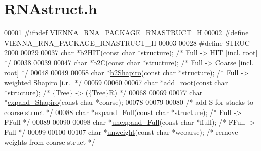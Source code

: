 \hypertarget{RNAstruct_8h_source}{}\section{R\+N\+Astruct.\+h}
\label{RNAstruct_8h_source}

\begin{DoxyCode}
00001 \textcolor{preprocessor}{#ifndef VIENNA\_RNA\_PACKAGE\_RNASTRUCT\_H}
00002 \textcolor{preprocessor}{#define VIENNA\_RNA\_PACKAGE\_RNASTRUCT\_H}
00003 
00028 \textcolor{preprocessor}{#define STRUC     2000}
00029 
00037 \textcolor{keywordtype}{char} *\hyperlink{group__struct__utils_ga07b7e90e712559a1992fba3ac6d21bbd}{b2HIT}(\textcolor{keyword}{const} \textcolor{keywordtype}{char} *structure);             \textcolor{comment}{/* Full   -> HIT    [incl. root] */}
00038 
00039 
00047 \textcolor{keywordtype}{char} *\hyperlink{group__struct__utils_ga9c80d92391f2833549a8b6dac92233f0}{b2C}(\textcolor{keyword}{const} \textcolor{keywordtype}{char} *structure);               \textcolor{comment}{/* Full   -> Coarse [incl. root] */}
00048 
00049 
00058 \textcolor{keywordtype}{char} *\hyperlink{group__struct__utils_ga5cd2feb367feeacad0c03cb7ddba5f10}{b2Shapiro}(\textcolor{keyword}{const} \textcolor{keywordtype}{char} *structure);         \textcolor{comment}{/* Full -> weighted Shapiro [i.r.] */}
00059 
00060 
00067 \textcolor{keywordtype}{char} *\hyperlink{group__struct__utils_ga880d33066dd95441e5fbb73c57ed1c3e}{add\_root}(\textcolor{keyword}{const} \textcolor{keywordtype}{char} *structure);                   \textcolor{comment}{/* \{Tree\} -> (\{Tree\}R)          */}
00068 
00069 
00077 \textcolor{keywordtype}{char} *\hyperlink{group__struct__utils_gabe3d815b420dc4553bfb23511198b4c6}{expand\_Shapiro}(\textcolor{keyword}{const} \textcolor{keywordtype}{char} *coarse);
00078 
00079 
00080 \textcolor{comment}{/* add S for stacks to coarse struct */}
00088 \textcolor{keywordtype}{char} *\hyperlink{group__struct__utils_ga78d73cd54a068ef2812812771cdddc6f}{expand\_Full}(\textcolor{keyword}{const} \textcolor{keywordtype}{char} *structure);       \textcolor{comment}{/* Full   -> FFull         */}
00089 
00090 
00098 \textcolor{keywordtype}{char} *\hyperlink{group__struct__utils_ga260c4b622093b76a883bf96628280de1}{unexpand\_Full}(\textcolor{keyword}{const} \textcolor{keywordtype}{char} *ffull);         \textcolor{comment}{/* FFull  -> Full          */}
00099 
00100 
00107 \textcolor{keywordtype}{char} *\hyperlink{group__struct__utils_ga09a80253ac7b6bae606871ba7c6e5136}{unweight}(\textcolor{keyword}{const} \textcolor{keywordtype}{char} *wcoarse);            \textcolor{comment}{/* remove weights from coarse struct */}

\end{DoxyCode}
